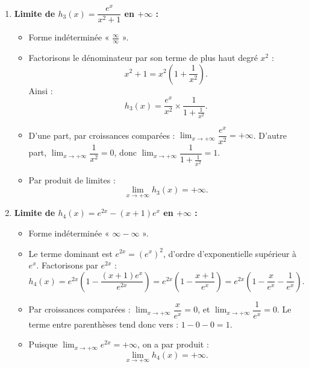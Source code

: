 \documentclass[11pt,a4paper]{article}
\begin{document}
\begin{correctionbox}[Exercice 11]
\begin{enumerate}[label=\textbf{\arabic*.}]
    \item \textbf{Limite de $h_3(x) = \dfrac{e^x}{x^2 + 1}$ en $+\infty$ :}
    \begin{itemize}
        \item Forme indéterminée « $\frac{\infty}{\infty}$ ».
        \item Factorisons le dénominateur par son terme de plus haut degré $x^2$ :
        \[
        x^2 + 1 = x^2 \left(1 + \frac{1}{x^2}\right).
        \]
        Ainsi :
        \[
        h_3(x) = \frac{e^x}{x^2} \times \frac{1}{1 + \frac{1}{x^2}}.
        \]
        \item D'une part, par croissances comparées : $\lim_{x \to +\infty} \dfrac{e^x}{x^2} = +\infty$.
        D'autre part, $\lim_{x \to +\infty} \dfrac{1}{x^2} = 0$, donc $\lim_{x \to +\infty} \dfrac{1}{1 + \frac{1}{x^2}} = 1$.
        \item Par produit de limites :
        \[
        \boxed{\lim_{x \to +\infty} h_3(x) = +\infty}.
        \]
    \end{itemize}

    \item \textbf{Limite de $h_4(x) = e^{2x} - (x+1)e^x$ en $+\infty$ :}
    \begin{itemize}
        \item Forme indéterminée « $\infty - \infty$ ».
        \item Le terme dominant est $e^{2x} = (e^x)^2$, d'ordre d'exponentielle supérieur à $e^x$. Factorisons par $e^{2x}$ :
        \[
        h_4(x) = e^{2x} \left(1 - \frac{(x+1)e^x}{e^{2x}}\right) = e^{2x} \left(1 - \frac{x+1}{e^x}\right) = e^{2x} \left(1 - \frac{x}{e^x} - \frac{1}{e^x}\right).
        \]
        \item Par croissances comparées : $\lim_{x \to +\infty} \dfrac{x}{e^x} = 0$, et $\lim_{x \to +\infty} \dfrac{1}{e^x} = 0$.
        Le terme entre parenthèses tend donc vers : $1 - 0 - 0 = 1$.
        \item Puisque $\lim_{x \to +\infty} e^{2x} = +\infty$, on a par produit :
        \[
        \boxed{\lim_{x \to +\infty} h_4(x) = +\infty}.
        \]
    \end{itemize}


\end{enumerate}
\end{correctionbox}
\end{document}
